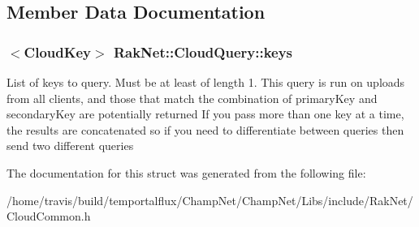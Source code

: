 \subsection{Member Data Documentation}
\hypertarget{struct_rak_net_1_1_cloud_query_a3a01154505b9a605142a8c95235d75ea}{
\subsubsection[{keys}]{$<${\bf Cloud\-Key}$>$ Rak\-Net\-::\-Cloud\-Query\-::keys}}\label{struct_rak_net_1_1_cloud_query_a3a01154505b9a605142a8c95235d75ea}
List of keys to query. Must be at least of length 1. This query is run on uploads from all clients, and those that match the combination of primary\-Key and secondary\-Key are potentially returned If you pass more than one key at a time, the results are concatenated so if you need to differentiate between queries then send two different queries 

The documentation for this struct was generated from the following file\-:\begin{DoxyCompactItemize}
\item 
/home/travis/build/temportalflux/\-Champ\-Net/\-Champ\-Net/\-Libs/include/\-Rak\-Net/Cloud\-Common.\-h\end{DoxyCompactItemize}
